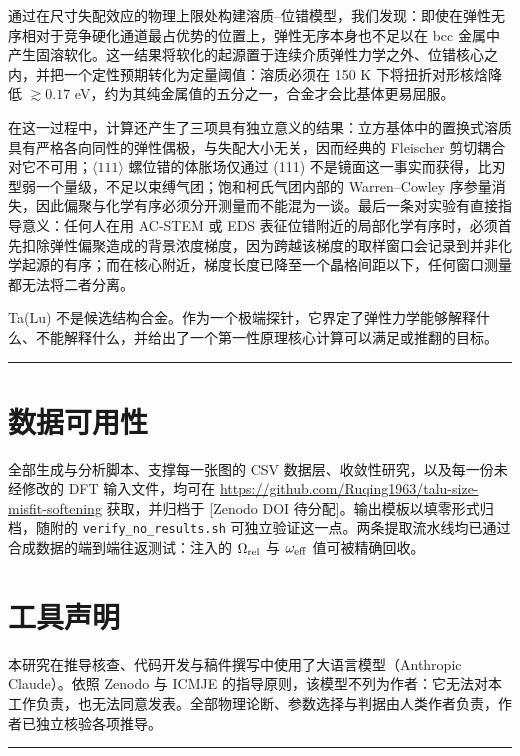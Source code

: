 \documentclass[11pt,a4paper]{article}
\begin{document}
通过在尺寸失配效应的物理上限处构建溶质--位错模型，我们发现：即使在弹性无序相对于竞争硬化通道最占优势的位置上，弹性无序本身也不足以在 bcc 金属中产生固溶软化。这一结果将软化的起源置于连续介质弹性力学之外、位错核心之内，并把一个定性预期转化为定量阈值：溶质必须在 150 K 下将扭折对形核焓降低 \(\gtrsim0.17\) eV，约为其纯金属值的五分之一，合金才会比基体更易屈服。

在这一过程中，计算还产生了三项具有独立意义的结果：立方基体中的置换式溶质具有严格各向同性的弹性偶极，与失配大小无关，因而经典的 Fleischer 剪切耦合对它不可用；\(\langle111\rangle\) 螺位错的体胀场仅通过 (111) 不是镜面这一事实而获得，比刃型弱一个量级，不足以束缚气团；饱和柯氏气团内部的 Warren--Cowley 序参量消失，因此偏聚与化学有序必须分开测量而不能混为一谈。最后一条对实验有直接指导意义：任何人在用 AC-STEM 或 EDS 表征位错附近的局部化学有序时，必须首先扣除弹性偏聚造成的背景浓度梯度，因为跨越该梯度的取样窗口会记录到并非化学起源的有序；而在核心附近，梯度长度已降至一个晶格间距以下，任何窗口测量都无法将二者分离。

Ta(Lu) 不是候选结构合金。作为一个极端探针，它界定了弹性力学能够解释什么、不能解释什么，并给出了一个第一性原理核心计算可以满足或推翻的目标。

\begin{center}\rule{0.5\linewidth}{0.5pt}\end{center}

\hypertarget{ux6570ux636eux53efux7528ux6027}{%
\section*{数据可用性}\label{sec:ux6570ux636eux53efux7528ux6027}}

全部生成与分析脚本、支撑每一张图的 CSV 数据层、收敛性研究，以及每一份未经修改的 DFT 输入文件，均可在 \url{https://github.com/Ruqing1963/talu-size-misfit-softening} 获取，并归档于 {[}Zenodo DOI 待分配{]}。输出模板以填零形式归档，随附的 \texttt{verify\_no\_results.sh} 可独立验证这一点。两条提取流水线均已通过合成数据的端到端往返测试：注入的 \(\Omega_{\rm rel}\) 与 \(\omega_{\rm eff}\) 值可被精确回收。

\hypertarget{ux5de5ux5177ux58f0ux660e}{%
\section*{工具声明}\label{sec:ux5de5ux5177ux58f0ux660e}}

本研究在推导核查、代码开发与稿件撰写中使用了大语言模型（Anthropic Claude）。依照 Zenodo 与 ICMJE 的指导原则，该模型不列为作者：它无法对本工作负责，也无法同意发表。全部物理论断、参数选择与判据由人类作者负责，作者已独立核验各项推导。

\begin{center}\rule{0.5\linewidth}{0.5pt}\end{center}



\end{document}

